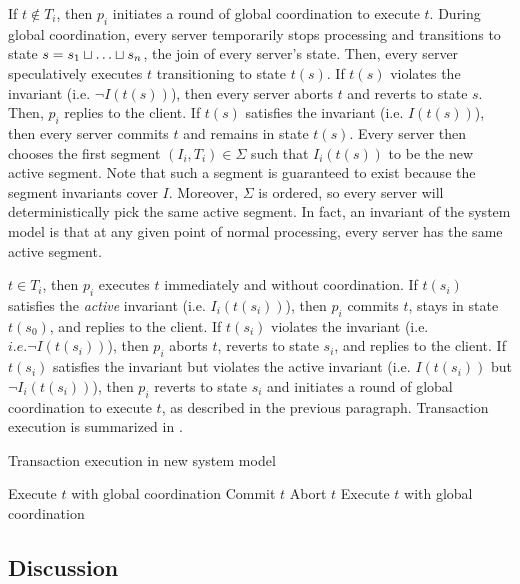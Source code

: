 If $t \notin T_i$, then $p_i$ initiates a round of global coordination to
execute $t$. During global coordination, every server temporarily stops
processing and transitions to state $s = s_1 \sqcup \ldots \sqcup s_n$, the join
of every server's state. Then, every server speculatively executes $t$
transitioning to state $t(s)$. If $t(s)$ violates the invariant (i.e.  $\lnot
I(t(s))$), then every server aborts $t$ and reverts to state $s$.  Then, $p_i$
replies to the client. If $t(s)$ satisfies the invariant (i.e. $I(t(s))$), then
every server commits $t$ and remains in state $t(s)$. Every server then chooses
the first segment $(I_i, T_i) \in \Sigma$ such that $I_i(t(s))$ to be the new
active segment. Note that such a segment is guaranteed to exist because the
segment invariants cover $I$. Moreover, $\Sigma$ is ordered, so every server
will deterministically pick the same active segment. In fact, an invariant of
the system model is that at any given point of normal processing, every server
has the same active segment.

$t \in T_i$, then $p_i$ executes $t$ immediately and without coordination. If
$t(s_i)$ satisfies the \emph{active} invariant (i.e. $I_i(t(s_i))$), then $p_i$
commits $t$, stays in state $t(s_0)$, and replies to the client. If $t(s_i)$
violates the invariant (i.e.  $i.e. \lnot I(t(s_i))$), then $p_i$ aborts $t$,
reverts to state $s_i$, and replies to the client. If $t(s_i)$ satisfies the
invariant but violates the active invariant (i.e. $I(t(s_i))$ but $\lnot
I_i(t(s_i))$), then $p_i$ reverts to state $s_i$ and initiates a round of
global coordination to execute $t$, as described in the previous paragraph.
Transaction execution is summarized in .

\begin{algorithm}[t]
  \caption{Transaction execution in new system model}%
  \begin{algorithmic}
      \State Execute $t$ with global coordination
    \Else{}
       Commit $t$
       Abort $t$
      \Else{} Execute $t$ with global coordination
      \EndIf{}
    \EndIf{}
  \end{algorithmic}
\end{algorithm}


\subsection{Discussion}

